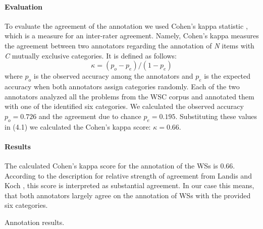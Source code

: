 \paragraph{Evaluation}
To evaluate the agreement of the annotation 
we used Cohen's kappa statistic \cite{doi:10.1177/001316446002000104}, which is a measure for an inter-rater agreement. Namely, Cohen's kappa measures the agreement between two annotators regarding the annotation of \textit{N} items with \textit{C} mutually exclusive categories. 
It is defined as follows: 
\begin{equation}
	\kappa = (p_o-p_e)/(1-p_e)
\end{equation}
where $p_o$ is the observed accuracy among the annotators and $p_e$ is the expected accuracy when both annotators assign categories randomly. Each of the two annotators analyzed all the problems from the WSC corpus and annotated them with one of the identified six categories. We calculated the observed accuracy $p_o = 0.726$ and the agreement due to chance $p_e = 0.195$. Substituting these values in (4.1) we calculated  the Cohen's kappa score: $\kappa = 0.66$.

\paragraph{Results}
The calculated Cohen's kappa score for the annotation of the WSs is 0.66. According to the description for relative strength of agreement from Landis and Koch \cite{articleM}, this score is interpreted as substantial agreement. In our case this means, that both annotators largely agree on the annotation of WSs with the provided six categories.

\begin{table}[h!]
	\centering
	
	\caption{{\label{kappa}}Annotation results.}
\end{table}

